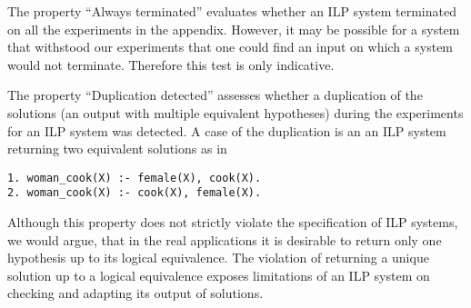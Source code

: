 The property ``Always terminated'' evaluates whether an ILP system terminated on all the experiments in the appendix. However, it may be possible for a system that withstood our experiments that one could find an input on which a system would not terminate. Therefore this test is only indicative.

The property ``Duplication detected'' assesses whether a duplication of the solutions
(an output with multiple equivalent hypotheses)
during the experiments for an ILP system was detected.
A case of the duplication is an an ILP system returning two equivalent solutions as in
\begin{lstlisting}
1. woman_cook(X) :- female(X), cook(X).
2. woman_cook(X) :- cook(X), female(X).
\end{lstlisting}
Although this property does not strictly violate the specification of ILP systems, we would argue, that in the real applications it is desirable to return only one hypothesis up to its logical equivalence. The violation of returning a unique solution up to a logical equivalence exposes limitations of an ILP system on checking and adapting its output of solutions.

